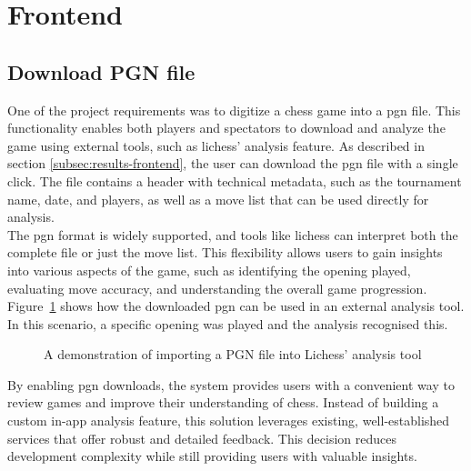 \section{Frontend}
\subsection{Download PGN file}
One of the project requirements was to digitize a chess game into a \gls{pgn} file. This functionality enables both players and spectators to download and analyze the game using external tools, such as \gls{lichess}’ analysis feature. As described in section \ref{subsec:results-frontend}, the user can download the \gls{pgn} file with a single click. The file contains a header with technical metadata, such as the tournament name, date, and players, as well as a move list that can be used directly for analysis. \\

The \gls{pgn} format is widely supported, and tools like \gls{lichess} can interpret both the complete file or just the move list. This flexibility allows users to gain insights into various aspects of the game, such as identifying the opening played, evaluating move accuracy, and understanding the overall game progression. Figure~\ref{fig:downloaded-pgn-analysis} shows how the downloaded \gls{pgn} can be used in an external analysis tool. In this scenario, a specific opening was played and the analysis recognised this. \\

\begin{figure}[h!] \centering {}\caption[Lichess analysis tool]{A demonstration of importing a PGN file into Lichess' analysis tool}\label{fig:downloaded-pgn-analysis} \end{figure}

By enabling \gls{pgn} downloads, the system provides users with a convenient way to review games and improve their understanding of chess. Instead of building a custom in-app analysis feature, this solution leverages existing, well-established services that offer robust and detailed feedback. This decision reduces development complexity while still providing users with valuable insights. \\

